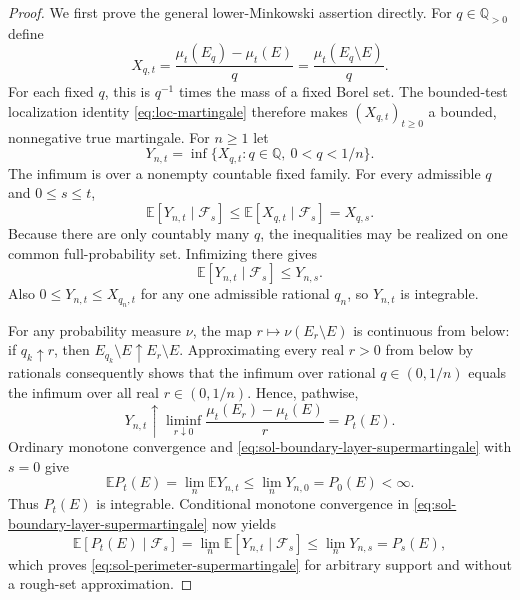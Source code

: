 \documentclass[../main.tex]{subfiles}
\begin{document}
\begin{proof}
We first prove the general lower-Minkowski assertion directly.  For $q\in\mathbb Q_{>0}$ define
\[
  X_{q,t}=\frac{\mu_t(E_q)-\mu_t(E)}q
         =\frac{\mu_t(E_q\setminus E)}q.
\]
For each fixed $q$, this is $q^{-1}$ times the mass of a fixed Borel set.  The bounded-test
localization identity \eqref{eq:loc-martingale} therefore makes
$(X_{q,t})_{t\geq0}$ a bounded, nonnegative true
martingale.  For $n\geq1$ let
\[
  Y_{n,t}=\inf\{X_{q,t}:q\in\mathbb Q,\ 0<q<1/n\}.
\]
The infimum is over a nonempty countable fixed family.  For every admissible $q$ and
$0\leq s\leq t$,
\[
  \mathbb E[Y_{n,t}\mid\mathcal F_s]
  \leq\mathbb E[X_{q,t}\mid\mathcal F_s]=X_{q,s}.
\]
Because there are only countably many $q$, the inequalities may be realized on one common
full-probability set.  Infimizing there gives
\begin{equation}
  \mathbb E[Y_{n,t}\mid\mathcal F_s]\leq Y_{n,s}.
  \label{eq:sol-boundary-layer-supermartingale}
\end{equation}
Also $0\leq Y_{n,t}\leq X_{q_n,t}$ for any one admissible rational $q_n$, so $Y_{n,t}$ is
integrable.

For any probability measure $\nu$, the map $r\mapsto\nu(E_r\setminus E)$ is continuous from
below: if $q_k\uparrow r$, then $E_{q_k}\setminus E\uparrow E_r\setminus E$.  Approximating
every real $r>0$ from below by rationals consequently shows that the infimum over rational
$q\in(0,1/n)$ equals the infimum over all real $r\in(0,1/n)$.  Hence, pathwise,
\begin{equation}
  Y_{n,t}\uparrow
  \liminf_{r\downarrow0}\frac{\mu_t(E_r)-\mu_t(E)}r=P_t(E).
  \label{eq:sol-boundary-layer-limit}
\end{equation}
Ordinary monotone convergence and \eqref{eq:sol-boundary-layer-supermartingale} with $s=0$
give
\[
  \mathbb E P_t(E)
  =\lim_n\mathbb E Y_{n,t}
  \leq\lim_nY_{n,0}=P_0(E)<\infty.
\]
Thus $P_t(E)$ is integrable.  Conditional monotone convergence in
\eqref{eq:sol-boundary-layer-supermartingale} now yields
\[
  \mathbb E[P_t(E)\mid\mathcal F_s]
  =\lim_n\mathbb E[Y_{n,t}\mid\mathcal F_s]
  \leq\lim_nY_{n,s}=P_s(E),
\]
which proves \eqref{eq:sol-perimeter-supermartingale} for arbitrary support and without a
rough-set approximation.


\end{proof}
\end{document}
